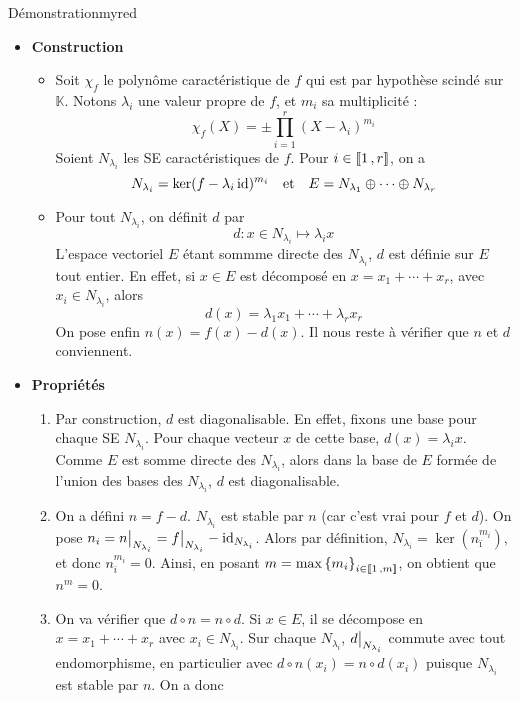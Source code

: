     \begin{demo}{Démonstration}{myred}
        \begin{itemize}[label=\textcolor{myred}{$\to$}]
            \item \textbf{Construction} \quad \begin{itemize}
                \item Soit $\chi_f$ le polynôme caractéristique de $f$ qui est par hypothèse scindé sur $\mathbb{K}$. Notons $\lambda_i$ une valeur propre de $f$, et $m_i$ sa multiplicité : 
                \[ \chi_f(X) = \pm \prod_{i = 1}^r (X - \lambda_i)^{m_i} \]   
                Soient $N_{\lambda_i}$ les SE caractéristiques de $f$. Pour $i \in \left\llbracket 1 \, , r \right\rrbracket$, on a 
                \[ N_{\lambda_i} = \ker(f - \lambda_i  \operatorname{id})^{m_i} \quad \text{et} \quad E = N_{\lambda_1} \oplus \cdots \oplus N_{\lambda_r} \]    
                \item Pour tout $N_{\lambda_i}$, on définit $d$ par \[ d : x \in N_{\lambda_i} \mapsto \lambda_i x \]   
                L’espace vectoriel $E$ étant sommme directe des $N_{\lambda_i}$, $d$ est définie sur $E$ tout entier. En effet, si $x \in E$ est décomposé en $x = x_1 + \cdots + x_r$, avec $x_i \in N_{\lambda_i}$, alors 
                \[ d(x) = \lambda_1 x_1 + \cdots + \lambda_r x_r \]   
                On pose enfin $n(x) = f(x) - d(x)$. Il nous reste à vérifier que $n$ et $d$ conviennent.
            \end{itemize}
            \item \textbf{Propriétés} \begin{enumerate}
                \item Par construction, $d$ est diagonalisable. En effet, fixons une base pour chaque SE $N_{\lambda_i}$. Pour chaque vecteur $x$ de cette base, $d(x) = \lambda_i x$. Comme $E$ est somme directe des $N_{\lambda_i}$, alors dans la base de $E$ formée de l’union des bases des $N_{\lambda_i}$, $d$ est diagonalisable.
                \item On a défini $n = f - d$. $N_{\lambda_i}$ est stable par $n$ (car c’est vrai pour $f$ et $d$). On pose $n_i = \restr{n}{N_{\lambda_i}} = \restr{f}{N_{\lambda_i}} - \id_{N_{\lambda_i}}$. Alors par définition, $N_{\lambda_i} = \ker(n_ï^{m_i})$, et donc $n_i^{m_i} = 0$. Ainsi, en posant $m = \max\left\{m_i\right\}_{i \in \left\llbracket 1 \, , m \right\rrbracket}$, on obtient que $n^m = 0$.
                \item On va vérifier que $d \circ n = n \circ d$. Si $x \in E$, il se décompose en $x = x_1 + \cdots + x_r$ avec $x_i \in N_{\lambda_i}$. Sur chaque $N_{\lambda_i}$, $\restr{d}{N_{\lambda_i}}$ commute avec tout endomorphisme, en particulier avec $d \circ n(x_i) = n \circ d(x_i)$ puisque $N_{\lambda_i}$ est stable par $n$. On a donc 

\end{enumerate}
\end{itemize}
\end{demo}
